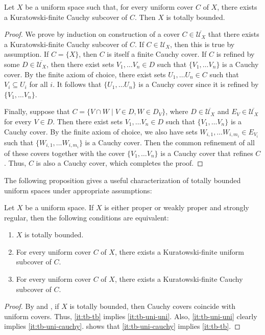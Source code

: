 \documentclass[reqno]{amsart}
\theoremstyle{definition}
\theoremstyle{remark}
\numberwithin{figure}{section}
\begin{document}
\begin{lem}[tb-aux]
Let $X$ be a uniform space such that, for every uniform cover $C$ of $X$, there exists a Kuratowski-finite Cauchy subcover of $C$.
Then $X$ is totally bounded.
\end{lem}
\begin{proof}
We prove by induction on construction of a cover $C \in \overline{\mathcal{U}_X}$ that there exists a Kuratowski-finite Cauchy subcover of $C$.
If $C \in \mathcal{U}_X$, then this is true by assumption.
If $C = \{ X \}$, then $C$ is itself a finite Cauchy cover.
If $C$ is refined by some $D \in \overline{\mathcal{U}_X}$, then there exist sets $V_1, \ldots V_n \in D$ such that $\{ V_1, \ldots V_n \}$ is a Cauchy cover.
By the finite axiom of choice, there exist sets $U_1, \ldots U_n \in C$ such that $V_i \subseteq U_i$ for all $i$.
It follows that $\{ U_1, \ldots U_n \}$ is a Cauchy cover since it is refined by $\{ V_1, \ldots V_n \}$.

Finally, suppose that $C = \{ V \cap W \mid V \in D, W \in D_V \}$, where $D \in \overline{\mathcal{U}_X}$ and $E_V \in \overline{\mathcal{U}_X}$ for every $V \in D$.
Then there exist sets $V_1, \ldots V_n \in D$ such that $\{ V_1, \ldots V_n \}$ is a Cauchy cover.
By the finite axiom of choice, we also have sets $W_{i,1}, \ldots W_{i,m_i} \in E_{V_i}$ such that $\{ W_{i,1}, \ldots W_{i,m_i} \}$ is a Cauchy cover.
Then the common refinement of all of these covers together with the cover $\{ V_1, \ldots V_n \}$ is a Cauchy cover that refines $C$.
Thus, $C$ is also a Cauchy cover, which completes the proof.
\end{proof}

The following proposition gives a useful characterization of totally bounded uniform spaces under appropriate assumptions:

\begin{prop}[tb-covers]
Let $X$ be a uniform space.
If $X$ is either proper or weakly proper and strongly regular, then the following conditions are equivalent:
\begin{enumerate}
\item \label{it:tb-tb} $X$ is totally bounded.
\item \label{it:tb-uni-uni} For every uniform cover $C$ of $X$, there exists a Kuratowski-finite uniform subcover of $C$.
\item \label{it:tb-uni-cauchy} For every uniform cover $C$ of $X$, there exists a Kuratowski-finite Cauchy subcover of $C$.
\end{enumerate}
\end{prop}
\begin{proof}
By  and , if $X$ is totally bounded, then Cauchy covers coincide with uniform covers.
Thus, \eqref{it:tb-tb} implies \eqref{it:tb-uni-uni}.
Also, \eqref{it:tb-uni-uni} clearly implies \eqref{it:tb-uni-cauchy}.
 shows that \eqref{it:tb-uni-cauchy} implies \eqref{it:tb-tb}.
\end{proof}
\end{document}
